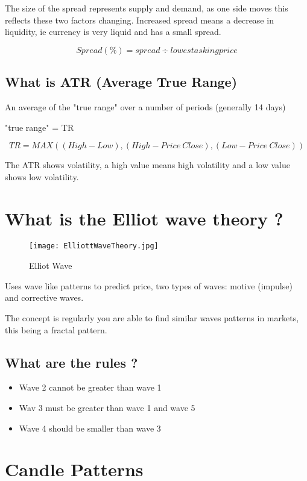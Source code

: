 \documentclass[11pt]{scrartcl} %
\begin{document}
The size of the spread represents supply and demand, as one side moves this reflects these two factors
changing. Increased spread means a decrease in liquidity, ie currency is very liquid and has a small spread.

\[ Spread(\%) = spread \div lowest asking price \]

\subsection{What is ATR (Average True Range)}

An average of the "true range" over a number of periods (generally 14 days)

"true range" = TR

\[ TR = MAX((High-Low),(High - Price\:Close),(Low-Price\:Close)) \]

The ATR shows volatility, a high value means high volatility and a low value shows low volatility.

\section{What is the Elliot wave theory ?}

\begin{figure}[t] %
	\centering
	\texttt{[image: ElliottWaveTheory.jpg]} %
	\caption{Elliot Wave}
\end{figure}

Uses wave like patterns to predict price, two types of waves: motive (impulse) and corrective waves.

The concept is regularly you are able to find similar waves patterns in markets, this being
a fractal pattern.

\subsection{What are the rules ?}

\begin{itemize}
	\item Wave 2 cannot be greater than wave 1
	\item Wav 3 must be greater than wave 1 and wave 5
	\item Wave 4 should be smaller than wave 3
\end{itemize}

\section{Candle Patterns}
\end{document}
